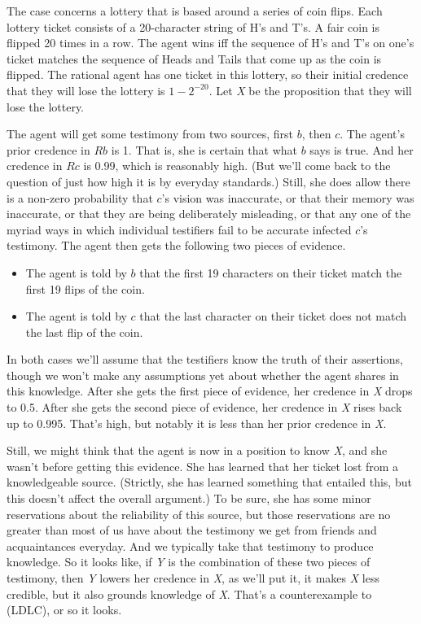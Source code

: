 \documentclass[
  10pt,
  letterpaper,
  DIV=11,
  numbers=noendperiod,
  twoside]{scrartcl}
\begin{document}
The case concerns a lottery that is based around a series of coin flips.
Each lottery ticket consists of a 20-character string of H's and T's. A
fair coin is flipped 20 times in a row. The agent wins iff the sequence
of H's and T's on one's ticket matches the sequence of Heads and Tails
that come up as the coin is flipped. The rational agent has one ticket
in this lottery, so their initial credence that they will lose the
lottery is \(1 - 2^{-20}\). Let \emph{X} be the proposition that they
will lose the lottery.

The agent will get some testimony from two sources, first \(b\), then
\(c\). The agent's prior credence in \(Rb\) is 1. That is, she is
certain that what \(b\) says is true. And her credence in \(Rc\) is
0.99, which is reasonably high. (But we'll come back to the question of
just how high it is by everyday standards.) Still, she does allow there
is a non-zero probability that \(c\)'s vision was inaccurate, or that
their memory was inaccurate, or that they are being deliberately
misleading, or that any one of the myriad ways in which individual
testifiers fail to be accurate infected \(c\)'s testimony. The agent
then gets the following two pieces of evidence.

\begin{itemize}
\item
  The agent is told by \(b\) that the first 19 characters on their
  ticket match the first 19 flips of the coin.
\item
  The agent is told by \(c\) that the last character on their ticket
  does not match the last flip of the coin.
\end{itemize}

In both cases we'll assume that the testifiers know the truth of their
assertions, though we won't make any assumptions yet about whether the
agent shares in this knowledge. After she gets the first piece of
evidence, her credence in \emph{X} drops to 0.5. After she gets the
second piece of evidence, her credence in \emph{X} rises back up to
0.995. That's high, but notably it is less than her prior credence in
\emph{X}.

Still, we might think that the agent is now in a position to know
\emph{X}, and she wasn't before getting this evidence. She has learned
that her ticket lost from a knowledgeable source. (Strictly, she has
learned something that entailed this, but this doesn't affect the
overall argument.) To be sure, she has some minor reservations about the
reliability of this source, but those reservations are no greater than
most of us have about the testimony we get from friends and
acquaintances everyday. And we typically take that testimony to produce
knowledge. So it looks like, if \emph{Y} is the combination of these two
pieces of testimony, then \emph{Y} lowers her credence in \emph{X}, as
we'll put it, it makes \emph{X} less credible, but it also grounds
knowledge of \emph{X}. That's a counterexample to (LDLC), or so it
looks.
\end{document}
